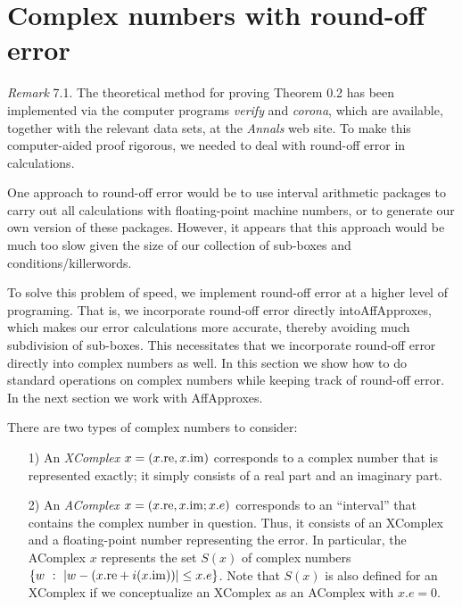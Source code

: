 \section{Complex numbers with round-off error}


{\it Remark} 7.1.
The theoretical method for proving Theorem 0.2 has been implemented via the computer programs {\it verify} and {\it corona}, which are available, together with the relevant data sets, at the {\it Annals} web site.  To make this computer-aided proof rigorous, we needed to deal with round-off error in calculations.  

One approach to round-off error would be to use interval arithmetic packages to carry out all calculations with floating-point machine numbers, or to generate our own version of these packages.  
However, it appears that this approach
would be much too slow given the size of our collection of sub-boxes and conditions/killerwords.  

To solve this problem of speed, we implement round-off error at a higher level of programing.  That is, we incorporate round-off error directly
 into\break AffApproxes,  which makes our error calculations more accurate, thereby avoiding much subdivision of
sub-boxes. This necessitates that we incorporate round-off error directly into complex numbers as well. 
In this section we show how to do standard operations on complex numbers while keeping track of round-off error.
In the next section we work with  AffApproxes.

There are two types of complex numbers to consider: 

\begin{itemize}
\item[1)]  An {\it XComplex} $x = (x.{\rm re}, x.{\rm im})$ corresponds to a complex number that is represented exactly; it
simply consists of a real part and an imaginary part.

\item[2)]  An {\it AComplex} $x = (x.{\rm re}, x.{\rm im}; x.e)$ corresponds to an ``interval'' that contains the complex number in
question.  Thus, it consists of an XComplex and a floating-point number representing the error.  In particular, the AComplex
$x$ represents the set $S(x)$ of complex numbers\break 
$\{w\ :\ |w - (x.{\rm re} + i (x.{\rm im}))| \le x.e\}$.  Note that $S(x)$ is also defined
for an XComplex if we conceptualize an XComplex as an AComplex with
$x.e = 0.$
\end{itemize}

